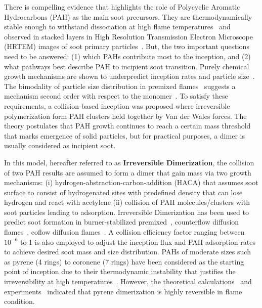 There is compelling evidence that highlights the role of Polycyclic Aromatic Hydrocarbons (PAH) as the main soot precursors. They are thermodynamically stable enough to withstand dissociation at high flame temperatures~\citep{stein1985high} and observed in stacked layers in High Resolution Transmission Electron Microscope (HRTEM) images of soot primary particles~\citep{Oberlin1984}. But, the two important questions need to be answered: (1) which PAHs contribute most to the inception, and (2) what pathways best describe PAH to incipient soot transition. Purely chemical growth mechanisms are shown to underpredict inception rates and particle size~\citep{frenklach2002reaction}. The bimodality of particle size distribution in premixed flames~\citep{camacho2015mobility} suggests a mechanism second order with respect to the monomer~\citep{Wang2011}. To satisfy these requirements, a collision-based inception was proposed where irreversible polymerization form PAH clusters held together by Van der Wales forces. The theory postulates that PAH growth continues to reach a certain mass threshold that marks emergence of solid particles, but for practical purposes, a dimer is usually considered as incipient soot. 

In this model, hereafter referred to as \textbf{Irreversible Dimerization}, the collision of two PAH results are assumed to form a dimer that gain mass via two growth mechanisms: (i) hydrogen-abstraction-carbon-addition (HACA) that assumes soot surface to consist of hydrogenated sites with predefined density that can lose hydrogen and react with acetylene (ii) collision of PAH molecules/clusters with soot particles leading to adsorption. Irreversible Dimerization has been used to predict soot formation in burner-stabilized premixed~\citep{salenbauch2015modeling, desgroux2017comparative}, counterflow diffusion flames~\citep{wang2015soot, xu2021experimental}, coflow diffusion flames~\citep{kholghy2016core, veshkini2016understanding}. A collision efficiency factor ranging between $10^{-6}$ to 1 is also employed to adjust the inception flux and PAH adsorption rates to achieve desired soot mass and size distribution. PAHs of moderate sizes such as pyrene (4 rings) to coronene (7 rings) have been considered as the starting point of inception due to their thermodynamic instability that justifies the irreversibility at high temperatures~\citep{frenklach1991detailed}. However, the theoretical calculations~\citep{miller1985calculations} and experiments~\citep{sabbah2010exploring} indicated that pyrene dimerization is highly reversible in flame condition.


% 




